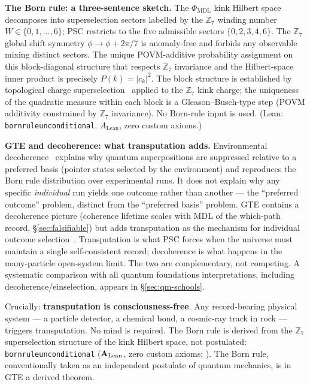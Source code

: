 \documentclass[11pt]{article}
\theoremstyle{remark}
\newcommand{\PHIMDL}{\Phi_{\mathrm{MDL}}}
\newcommand{\lean}[1]{%
  \penalty-100
  \begingroup\def\_{\textunderscore\allowbreak}\texttt{#1}\endgroup}
\newcommand{\CatAL}{\ensuremath{\textbf{A}_{\rm Lean}}}
\begin{document}
\medskip
\noindent\textbf{The Born rule: a three-sentence sketch.}
The $\PHIMDL$ kink Hilbert space decomposes into superselection sectors labelled by
the $\mathbb{Z}_7$ winding number $W \in \{0,1,\ldots,6\}$; PSC restricts to the
five admissible sectors $\{0,2,3,4,6\}$.
The $\mathbb{Z}_7$ global shift symmetry $\phi \to \phi + 2\pi/7$ is anomaly-free
and forbids any observable mixing distinct sectors.
The unique POVM-additive probability assignment on this block-diagonal structure that
respects $\mathbb{Z}_7$ invariance and the Hilbert-space inner product is precisely
$P(k) = |c_k|^2$. The block structure is established by topological charge
superselection~\cite{Coleman1975,Mandelstam1975,Rajaraman1982} applied to the
$\mathbb{Z}_7$ kink charge; the uniqueness of the quadratic measure within each block
is a Gleason--Busch-type step (POVM additivity constrained by $\mathbb{Z}_7$
invariance). No Born-rule input is used.
(Lean: \lean{born\_rule\_unconditional}, $A_\text{Lean}$, zero custom axioms.)

\medskip
\noindent\textbf{GTE and decoherence: what transputation adds.}
Environmental decoherence~\cite{Zurek2003} explains why quantum superpositions are
suppressed relative to a preferred basis (pointer states selected by the environment)
and reproduces the Born rule distribution over experimental runs. It does not explain
why any specific \emph{individual} run yields one outcome rather than another --- the
``preferred outcome'' problem, distinct from the ``preferred basis'' problem.
GTE contains a decoherence picture (coherence lifetime scales with MDL of the
which-path record, \S\ref{sec:falsifiable}) but adds transputation as the mechanism
for individual outcome selection~\cite{SpivackGTECompleteFramework,SpivackPolynomialTransputation}.
Transputation is what PSC forces when the universe must maintain a single self-consistent
record; decoherence is what happens in the many-particle open-system limit.
The two are complementary, not competing. A systematic comparison with all quantum
foundations interpretations, including decoherence/einselection, appears in
\S\ref{sec:qm-schools}.

Crucially: \textbf{transputation is consciousness-free}. Any record-bearing physical
system --- a particle detector, a chemical bond, a cosmic-ray track in rock ---
triggers transputation. No mind is required. The Born rule is derived from the
$\mathbb{Z}_7$ superselection structure of the kink Hilbert space, not postulated:
\lean{born\_rule\_unconditional} (\CatAL, zero custom axioms;
\cite{SpivackGTECompleteFramework,SpivackQMFromR110}). The Born rule, conventionally
taken as an independent postulate of quantum mechanics, is in GTE a derived theorem.
\end{document}
